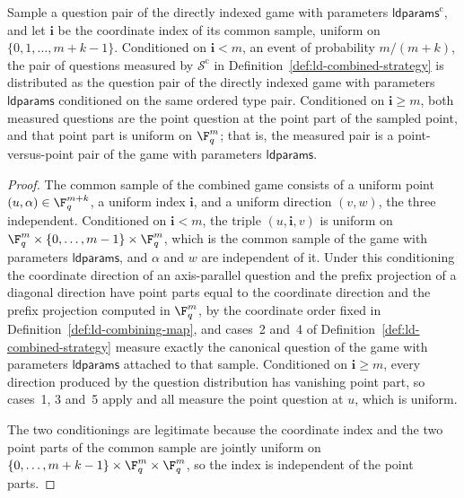 \begin{lemma}
	\label{lem:ld-combined-question-law}
	\leanok
	Sample a question pair of the directly indexed game with parameters
	$\mathsf{ldparams}^{\mathrm c}$, and let $\mathbf{i}$ be the coordinate index
	of its common sample, uniform on $\{0,1,\ldots,m+k-1\}$.  Conditioned on
	$\mathbf{i} < m$, an event of probability $m/(m+k)$, the pair of questions
	measured by $\mathcal S^{\mathrm c}$ in Definition~\ref{def:ld-combined-strategy}
	is distributed as the question pair of the directly indexed game with
	parameters $\mathsf{ldparams}$ conditioned on the same ordered type pair.
	Conditioned on $\mathbf{i} \ge m$, both measured questions are the point
	question at the point part of the sampled point, and that point part is
	uniform on $\F_q^m$; that is, the measured pair is a point-versus-point pair
	of the game with parameters $\mathsf{ldparams}$.
\end{lemma}
\begin{proof}
	\leanok
	The common sample of the combined game consists of a uniform point
	$(u,\alpha) \in \F_q^{m+k}$, a uniform index $\mathbf{i}$, and a uniform
	direction $(v,w)$, the three independent.  Conditioned on $\mathbf{i} < m$,
	the triple $(u, \mathbf{i}, v)$ is uniform on
	$\F_q^m \times \{0,\ldots,m-1\} \times \F_q^m$, which is the common sample of
	the game with parameters $\mathsf{ldparams}$, and $\alpha$ and $w$ are
	independent of it.  Under this conditioning the coordinate direction of an
	axis-parallel question and the prefix projection of a diagonal direction have
	point parts equal to the coordinate direction and the prefix projection
	computed in $\F_q^m$, by the coordinate order fixed in
	Definition~\ref{def:ld-combining-map}, and cases~2 and~4 of
	Definition~\ref{def:ld-combined-strategy} measure exactly the canonical
	question of the game with parameters $\mathsf{ldparams}$ attached to that
	sample.  Conditioned on $\mathbf{i} \ge m$, every direction produced by the
	question distribution has vanishing point part, so cases~1, 3 and~5 apply and
	all measure the point question at $u$, which is uniform.

	The two conditionings are legitimate because the coordinate index and
	the two point parts of the common sample are jointly uniform on
	$\{0,\ldots,m+k-1\} \times \F_q^m \times \F_q^m$, so the index is
	independent of the point parts.
\end{proof}

